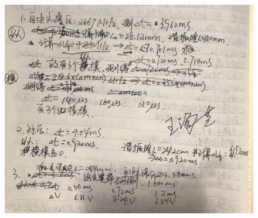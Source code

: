 \documentclass[UTF8]{ctexart}
\begin{document}
\begin{figure}[H]
\centering
\includegraphics[width=14cm]{statistic}
\end{figure}
\end{document}
